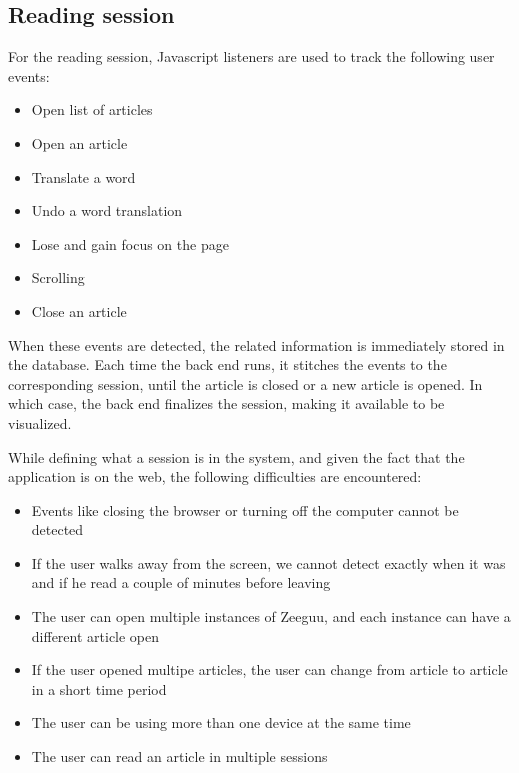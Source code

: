 \subsection{Reading session}\label{p02:session_tracking_read_session}
For the reading session, Javascript listeners are used to track the following user events:
\begin{itemize}
	\item Open list of articles
	\item Open an article
	\item Translate a word
	\item Undo a word translation
	\item Lose and gain focus on the page
	\item Scrolling
	\item Close an article
\end{itemize}

When these events are detected, the related information is immediately stored in the database. Each time the back end runs, it stitches the events to the corresponding session, until the article is closed or a new article is opened. In which case, the back end finalizes the session, making it available to be visualized.

While defining what a session is in the system, and given the fact that the application is on the web, the following difficulties are encountered:
\begin{itemize}
	\item Events like closing the browser or turning off the computer cannot be detected
	\item If the user walks away from the screen, we cannot detect exactly when it was and if he read a couple of minutes before leaving
	\item The user can open multiple instances of Zeeguu, and each instance can have a different article open
	\item If the user opened multipe articles, the user can change from article to article in a short time period
	\item The user can be using more than one device at the same time
	\item The user can read an article in multiple sessions
\end{itemize}

